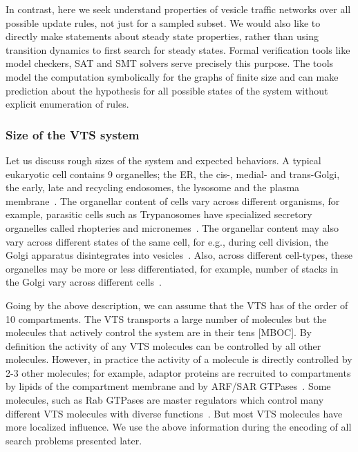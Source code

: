 In contrast, here we seek understand properties of vesicle traffic networks over all possible update rules, not just for a sampled subset. 
%
We would also like to directly make statements about steady state properties, rather
than using transition dynamics to first search for steady states. 
%
Formal verification tools like model checkers, SAT and SMT solvers serve precisely this purpose. 
%
The tools model the computation symbolically for the graphs of finite size and can make prediction about the hypothesis for all possible states of the system without explicit enumeration of rules. 
%

\subsubsection{Size of the VTS system}
Let us discuss rough sizes of the system and expected behaviors.
A typical eukaryotic cell contains 9 organelles; the ER, the cis-, medial- and trans-Golgi, the early, late and recycling endosomes, the lysosome and the plasma membrane~\cite{lodish2008molecular}. 
%
The organellar content of cells vary across different organisms, for example, parasitic cells such as Trypanosomes have specialized secretory organelles called rhopteries and micronemes~\cite{gubbels2012evolution}. 
%
The organellar content may also vary across different states of the same cell, for e.g., during cell division, the Golgi apparatus disintegrates into vesicles~\cite{tang2013cell}. 
%
Also, across different cell-types, these organelles may be more or less differentiated, for example, number of stacks in the Golgi vary across different cells~\cite{polishchuk2004structural}. 
%

Going by the above description, we can assume that the VTS has of the order of 10 compartments. 
%
The VTS transports a large number of molecules but the molecules that actively control the system are in their tens [MBOC]. 
%
By definition the activity of any VTS molecules can be controlled by all other molecules.
%
However, in practice the activity of a molecule is directly controlled by 2-3 other molecules; for example, adaptor proteins are recruited to compartments by lipids of the compartment membrane and by ARF/SAR GTPases~\cite{kahn2009toward}. 
%
Some molecules, such as Rab GTPases are master regulators which control many different VTS molecules with diverse functions~\cite{zerial2001rab}. 
%
But most VTS molecules have more localized influence.
%
We use the above information during the encoding of all search problems presented later.

